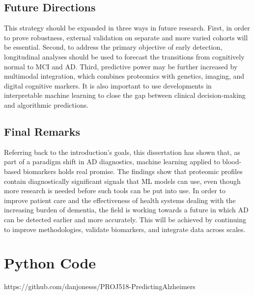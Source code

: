 \documentclass[a4paper,12pt]{article}
\begin{document}
\subsection{Future Directions}
This strategy should be expanded in three ways in future research.  First, in order to prove robustness, external validation on separate and more varied cohorts will be essential.  Second, to address the primary objective of early detection, longitudinal analyses should be used to forecast the transitions from cognitively normal to MCI and AD.  Third, predictive power may be further increased by multimodal integration, which combines proteomics with genetics, imaging, and digital cognitive markers.  It is also important to use developments in interpretable machine learning to close the gap between clinical decision-making and algorithmic predictions.

\subsection{Final Remarks}
Referring back to the introduction's goals, this dissertation has shown that, as part of a paradigm shift in AD diagnostics, machine learning applied to blood-based biomarkers holds real promise.  The findings show that proteomic profiles contain diagnostically significant signals that ML models can use, even though more research is needed before such tools can be put into use.  In order to improve patient care and the effectiveness of health systems dealing with the increasing burden of dementia, the field is working towards a future in which AD can be detected earlier and more accurately. This will be achieved by continuing to improve methodologies, validate biomarkers, and integrate data across scales.


\newpage
{}

 

\newpage
\appendix
\section{Python Code}

https://github.com/danjonesss/PROJ518-PredictingAlzheimers
\end{document}
